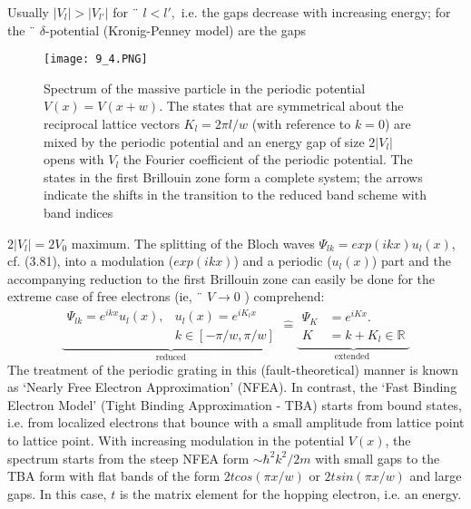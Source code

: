 Usually $| V_l | > | V_{l'} |$ for ¨ $l <l',$ i.e. the gaps decrease with increasing energy; for the ¨ $\delta$-potential (Kronig-Penney model) are the gaps
\begin{figure}[ht]
    \centering
    \texttt{[image: 9\_4.PNG]}
    \caption{Spectrum of the massive particle in the periodic potential $V (x) = V (x + w)$. The states that are symmetrical about the reciprocal lattice vectors $K_l = 2\pi l/w$ (with reference to $k = 0$) are mixed by the periodic potential and an energy gap of size $2|V_l|$ opens with $V_l$ the Fourier coefficient of the periodic potential. The states in the first Brillouin zone form a complete system; the arrows indicate the shifts in the transition to the reduced band scheme with band indices}
\end{figure}
$2 | V_l | = 2V_0$ maximum. The splitting of the Bloch waves $\Psi_{lk} = exp (ikx) u_l (x)$, cf. (3.81), into a modulation ($exp (ikx)$) and a periodic ($u_l (x)$) part and the accompanying reduction to the first Brillouin zone can easily be done for the extreme case of free electrons (ie, ¨ $V \rightarrow 0$ ) comprehend:
$$
    \underbrace{
        \begin{array}{ll}
            \Psi_{l k}=e^{i k x} u_{l}(x), & {u_{l}(x)=e^{i K_{l} x}}\\
            &{k \in[-\pi / w, \pi / w]} 
        \end{array}
    }_{\text{reduced}}   
    \hat{=}
    \underbrace{
        \begin{array}{ll}
            \Psi_K &= e^{iKx}.\\
            K &= k+K_l\in\mathbb{R}
        \end{array}
        }_{\text {extended }}
$$
The treatment of the periodic grating in this (fault-theoretical) manner is known as ‘Nearly Free Electron Approximation’ (NFEA). In contrast, the ‘Fast Binding Electron Model’ (Tight Binding Approximation - TBA) starts from bound states, i.e. from localized electrons that bounce with a small amplitude from lattice point to lattice point. With increasing modulation in the potential $V (x)$, the spectrum starts from the steep NFEA form $\sim\hbar^2k^2 / 2m$ with small gaps to the TBA form with flat bands of the form $2t cos (\pi x / w)$ or $2tsin (\pi x / w)$ and large gaps. In this case, $t$ is the matrix element for the hopping electron, i.e. an energy.

